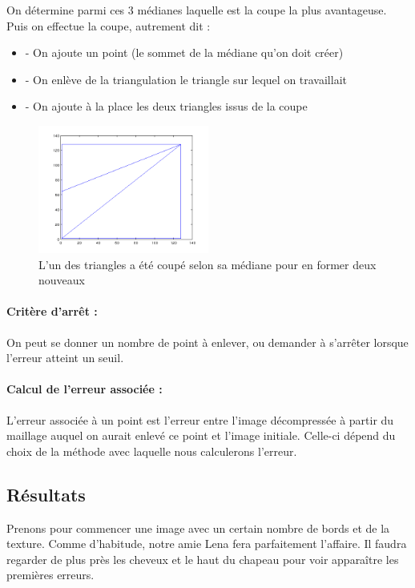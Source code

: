 \documentclass{report}
\begin{document}
On détermine parmi ces 3 médianes laquelle est la coupe la plus avantageuse. Puis on effectue la coupe, autrement dit :
\begin{itemize}
	\item - On ajoute un point (le sommet de la médiane qu'on doit créer)
	\item - On enlève de la triangulation le triangle sur lequel on travaillait
	\item - On ajoute à la place les deux triangles issus de la coupe
\end{itemize}


\begin{figure}[ht]
\centering
\includegraphics[width=0.5\textwidth]{beginBissect2.png}
\caption{L'un des triangles a été coupé selon sa médiane pour en former deux nouveaux}
\end{figure}

\paragraph{Critère d'arrêt :}
On peut se donner un nombre de point à enlever, ou demander à s'arrêter lorsque l'erreur atteint un seuil.

\paragraph{Calcul de l'erreur associée :}
L'erreur associée à un point est l'erreur entre l'image décompressée à partir du maillage auquel on aurait enlevé ce point et l'image initiale. Celle-ci dépend du choix de la méthode avec laquelle nous calculerons l'erreur.

\subsection{Résultats}

Prenons pour commencer une image avec un certain nombre de bords et de la texture. Comme d'habitude, notre amie Lena fera parfaitement l'affaire. Il faudra regarder de plus près les cheveux et le haut du chapeau pour voir apparaître les premières erreurs.
\end{document}
